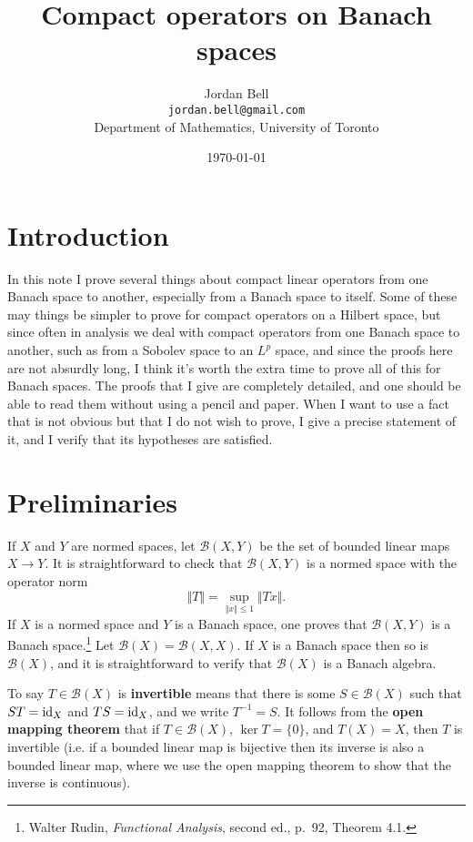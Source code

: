 \documentclass{article}
\newcommand{\id}{\ensuremath\mathrm{id}}
\newcommand{\norm}[1]{\Vert #1 \Vert}
\begin{document}
\title{Compact operators on Banach spaces}
\author{Jordan Bell\\ \texttt{jordan.bell@gmail.com}\\Department of Mathematics, University of Toronto}
\date{\today}

\maketitle

\section{Introduction}
In this note I prove several things about compact linear operators from one Banach space to another,  especially from a Banach space to itself.
Some of these may things be simpler to prove for compact  operators on a Hilbert space, but since often in analysis we deal with compact 
operators from one Banach space to another, such as from a Sobolev space to an $L^p$ space, and since the proofs here are not absurdly long,
I think it's worth the extra time to prove all of this for Banach spaces. The proofs that I  give are completely detailed, and one should be able to read them
without using a pencil and paper. When I want to use a fact that is not obvious but that I do not wish to prove, I give a precise statement of it, and
 I verify that its hypotheses are satisfied.

\section{Preliminaries}
If $X$ and $Y$ are normed spaces, let $\mathscr{B}(X,Y)$ be the set of bounded linear maps $X \to Y$. It is straightforward to check that $\mathscr{B}(X,Y)$ is a normed space with the operator
norm
\[
\norm{T} = \sup_{\norm{x} \leq 1} \norm{Tx}.
\]
If $X$ is a normed space and $Y$ is a Banach space, one proves that $\mathscr{B}(X,Y)$ is a Banach space.\footnote{Walter Rudin, {\em Functional Analysis}, second ed.,
p.~92, Theorem 4.1.} Let $\mathscr{B}(X)=\mathscr{B}(X,X)$. If $X$ is a Banach space then so is $\mathscr{B}(X)$, and it is straightforward to verify that $\mathscr{B}(X)$ is a Banach algebra.

To say $T \in \mathscr{B}(X)$ is \textbf{invertible} means that there is some $S \in \mathscr{B}(X)$ such that $ST=\id_X$ and
 $TS = \id_X$, and we write $T^{-1}=S$. It follows from the \textbf{open
mapping theorem} that if $T \in \mathscr{B}(X)$, $\ker T = \{0\}$, and $T(X)=X$, then $T$ is invertible (i.e. if a bounded linear map is bijective then
its inverse is also a bounded linear map, where we use the open mapping theorem to show that the inverse is continuous).
\end{document}
